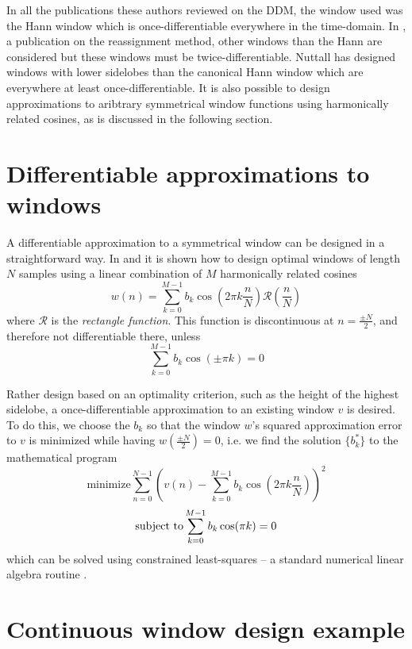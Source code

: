 \documentclass[twoside,a4paper]{article}
\begin{document}
In all the publications these authors reviewed on the DDM, the window used was
the Hann window which is once-differentiable everywhere in the time-domain. In
\cite{robel2002estimating}, a publication on the reassignment method, other
windows than the Hann are considered but these windows must be
twice-differentiable.  Nuttall \cite{nuttall1981some} has designed windows with
lower sidelobes than the canonical Hann window which are everywhere at least
once-differentiable. It is also possible to design approximations to aribtrary
symmetrical window functions using harmonically related cosines, as is discussed
in the following section.

\section{Differentiable approximations to windows}

A differentiable approximation to a symmetrical window can be designed in a
straightforward way. In \cite{harris1978use} and \cite{rabiner1970approach} it
is shown how to design optimal windows of length $N$ samples using a linear
combination of $M$ harmonically related cosines
\begin{equation}
    w(n) = \sum_{k=0}^{M-1} b_{k} \cos (2 \pi k \frac{n}{N})
\mathcal{R}(\frac{n}{N})
\end{equation}
where $\mathcal{R}$ is the \textit{rectangle function}. This function is
discontinuous
at $n = \frac{\pm N}{2}$, and therefore not differentiable there, unless
\[
\sum_{k=0}^{M-1} b_{k} \cos ( \pm \pi k ) = 0
\]

Rather design based on an optimality criterion, such as the height of the
highest sidelobe, a once-differentiable approximation to an existing window $v$ is
desired. To do this, we choose the $b_{k}$ so that the window $w$'s squared approximation error to
$v$ is minimized
while having $w(\frac{\pm N}{2}) = 0$, i.e. we find the solution $\{
b^{\ast}_{k} \}$ to the mathematical program
\begin{equation}
    \label{eq:searchcontwinprogram}
    \text{minimize}
    \sum_{n=0}^{N-1} ( v(n) 
        - \sum_{k=0}^{M-1} b_{k} \cos(2 \pi k \frac{n}{N}))^{2}
\end{equation}
\[
    \text{subject to} \\
    \sum_{k=0}^{M-1} b_{k} \cos(\pi k ) = 0
\]
which can be solved using constrained least-squares -- a standard numerical
linear algebra routine \cite[p.~585]{golub1996matrix}.

\section{Continuous window design example}
\label{sec:designexample}
\end{document}
